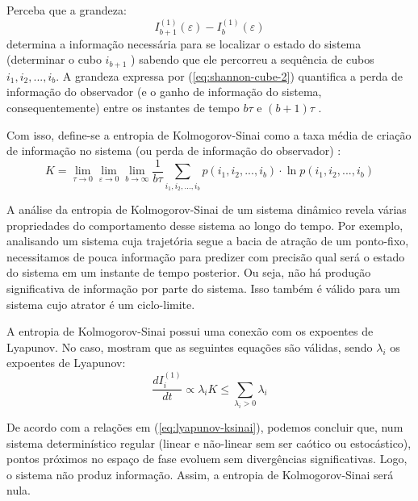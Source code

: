 \documentclass[a4paper, 12pt]{article}
\begin{document}
Perceba que a grandeza:
\begin{equation}\label{eq:shannon-cube-2}
I_{b+1}^{(1)} (\varepsilon) - I_{b}^{(1)} (\varepsilon)
\end{equation}
determina a informação necessária para se localizar o estado do sistema (determinar o cubo $i_{b+1}$ ) sabendo que ele percorreu a sequência de cubos $i_1, i_2, ..., i_b$. A grandeza expressa por (\ref{eq:shannon-cube-2}) quantifica a perda de informação do observador (e o ganho de informação do sistema, consequentemente) entre os instantes de tempo $b \tau$ e $(b+1)\tau$ \cite{attux2001dinamica}.

Com isso, define-se a entropia de Kolmogorov-Sinai como a taxa média de criação de informação no sistema (ou perda de informação do observador) \cite{fiedler1994caos, attux2001dinamica}:
\begin{equation}\label{eq:kolmogorov-sinai}
K = \lim_{\tau \rightarrow 0} \lim_{\varepsilon \rightarrow 0} \lim_{b \rightarrow \infty} \frac{1}{b\tau} \sum_{i_1, i_2, ..., i_b} p(i_1, i_2, ..., i_b) \cdot \ln p(i_1, i_2, ..., i_b)
\end{equation}

A análise da entropia de Kolmogorov-Sinai de um sistema dinâmico revela várias propriedades do comportamento desse sistema ao longo do tempo. Por exemplo, analisando um sistema cuja trajetória segue a bacia de atração de um ponto-fixo, necessitamos de pouca informação para predizer com precisão qual será o estado do sistema em um instante de tempo posterior. Ou seja, não há produção significativa de informação por parte do sistema. Isso também é válido para um sistema cujo atrator é um ciclo-limite.

A entropia de Kolmogorov-Sinai possui uma conexão com os expoentes de Lyapunov. No caso, \cite{attux2001dinamica, fiedler1994caos} mostram que as seguintes equações são válidas, sendo $\lambda_i$ os expoentes de Lyapunov:
\begin{subequations}\label{eq:lyapunov-ksinai}
\begin{equation}
\frac{dI_{i}^{(1)}}{dt} \propto \lambda_i
\end{equation}
\begin{equation}\label{eq:lyapunov-ksinai-entropy}
K \leq \sum_{\lambda_i > 0} \lambda_i
\end{equation}
\end{subequations}

De acordo com a relações em (\ref{eq:lyapunov-ksinai}), podemos concluir que, num sistema determinístico regular (linear e não-linear sem ser caótico ou estocástico), pontos próximos no espaço de fase evoluem sem divergências significativas. Logo, o sistema não produz informação. Assim, a entropia de Kolmogorov-Sinai será nula.
\end{document}
